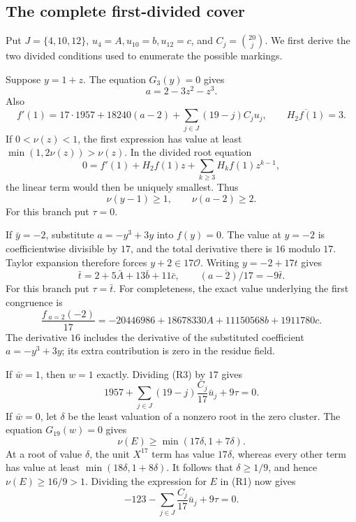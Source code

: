 \documentclass[
  british,
  10pt,
  a4paper,
]{article}
\begin{document}
\subsection{The complete first-divided
cover}\label{the-complete-first-divided-cover}

Put \(J=\{4,10,12\}\), \(u_4=A,u_{10}=b,u_{12}=c\), and
\(C_j=\binom{20}{j}\). We first derive the two divided conditions used
to enumerate the possible markings.

Suppose \(y=1+z\). The equation \(G_3(y)=0\) gives \[
a=2-3z^2-z^3.
\] Also \[
f'(1)=17\cdot1957+18240(a-2)
       +\sum_{j\in J}(19-j)C_ju_j,\qquad
\overline{H_2f(1)}=3.                                         \tag{R3}
\] If \(0<\nu(z)<1\), the first expression has value at least
\(\min(1,2\nu(z))>\nu(z)\). In the divided root equation \[
0=f'(1)+H_2f(1)z+\sum_{k\geq3}H_kf(1)z^{k-1},
\] the linear term would then be uniquely smallest. Thus \[
\nu(y-1)\geq1,\qquad \nu(a-2)\geq2.                            \tag{R4}
\] For this branch put \(\tau=0\).

If \(\bar y=-2\), substitute \(a=-y^3+3y\) into \(f(y)=0\). The value at
\(y=-2\) is coefficientwise divisible by \(17\), and the total
derivative there is \(16\) modulo \(17\). Taylor expansion therefore
forces \(y+2\in17\mathcal O\). Writing \(y=-2+17t\) gives \[
\bar t=2+5\bar A+13\bar b+11\bar c,\qquad
\overline{(a-2)/17}=-9\bar t.                                 \tag{R5}
\] For this branch put \(\tau=\bar t\). For completeness, the exact
value underlying the first congruence is \[
\frac{f_{\;a=2}(-2)}{17}
=-20446986+18678330A+11150568b+1911780c.
\] The derivative \(16\) includes the derivative of the substituted
coefficient \(a=-y^3+3y\); its extra contribution is zero in the residue
field.

If \(\bar w=1\), then \(w=1\) exactly. Dividing (R3) by \(17\) gives \[
1957+\sum_{j\in J}(19-j)\frac{C_j}{17}\bar u_j+9\tau=0.          \tag{R6}
\] If \(\bar w=0\), let \(\delta\) be the least valuation of a nonzero
root in the zero cluster. The equation \(G_{19}(w)=0\) gives \[
\nu(E)\geq\min(17\delta,1+7\delta).
\] At a root of value \(\delta\), the unit \(X^{17}\) term has value
\(17\delta\), whereas every other term has value at least
\(\min(18\delta,1+8\delta)\). It follows that \(\delta\geq1/9\), and
hence \(\nu(E)\geq16/9>1\). Dividing the expression for \(E\) in (R1)
now gives \[
-123-\sum_{j\in J}\frac{C_j}{17}\bar u_j+9\tau=0.                \tag{R7}
\]
\end{document}
